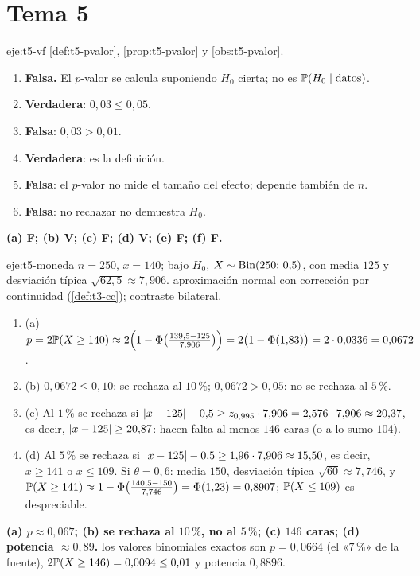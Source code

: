 \section{Tema 5}

\begin{solucion}{eje:t5-vf}
\planteamiento \cref{def:t5-pvalor}, \cref{prop:t5-pvalor} y \cref{obs:t5-pvalor}.
\pasos
\begin{enumerate}[label=(\alph*)]
  \item \textbf{Falsa.} El $p$-valor se calcula suponiendo $H_0$ cierta; no es $\mathbb{P}(H_0\mid\text{datos})$.
  \item \textbf{Verdadera}: $0{,}03\le0{,}05$.
  \item \textbf{Falsa}: $0{,}03>0{,}01$.
  \item \textbf{Verdadera}: es la definición.
  \item \textbf{Falsa}: el $p$-valor no mide el tamaño del efecto; depende también de $n$.
  \item \textbf{Falsa}: no rechazar no demuestra $H_0$.
\end{enumerate}
\resultado \textbf{(a) F; (b) V; (c) F; (d) V; (e) F; (f) F.}
\end{solucion}

\begin{solucion}{eje:t5-moneda}
\datos $n=250$, $x=140$; bajo $H_0$, $X\sim\operatorname{Bin}(250;\allowbreak\,0{,}5)$, con media $125$ y desviación típica $\sqrt{62{,}5}\approx7{,}906$.
\planteamiento aproximación normal con corrección por continuidad (\cref{def:t3-cc}); contraste bilateral.
\pasos
\begin{enumerate}[label=\arabic*.]
  \item (a) $p=2\mathbb{P}(X\ge140)\approx2\Bigl(1-\Phi\bigl(\tfrac{139{,}5-125}{7{,}906}\bigr)\Bigr)=2\bigl(1-\Phi(1{,}83)\bigr)=2\cdot0{,}0336=0{,}0672$.
  \item (b) $0{,}0672\le0{,}10$: se rechaza al $10\,\%$; $0{,}0672>0{,}05$: no se rechaza al $5\,\%$.
  \item (c) Al $1\,\%$ se rechaza si $\lvert x-125\rvert-0{,}5\ge z_{0{,}995}\cdot7{,}906=2{,}576\cdot7{,}906\approx20{,}37$, es decir, $\lvert x-125\rvert\ge20{,}87$: hacen falta al menos $146$ caras (o a lo sumo $104$).
  \item (d) Al $5\,\%$ se rechaza si $\lvert x-125\rvert-0{,}5\ge1{,}96\cdot7{,}906\approx15{,}50$, es decir, $x\ge141$ o $x\le109$. Si $\theta=0{,}6$: media $150$, desviación típica $\sqrt{60}\approx7{,}746$, y $\mathbb{P}(X\ge141)\approx1-\Phi\bigl(\tfrac{140{,}5-150}{7{,}746}\bigr)=\Phi(1{,}23)=0{,}8907$; $\mathbb{P}(X\le109)$ es despreciable.
\end{enumerate}
\resultado \textbf{(a) $p\approx0{,}067$; (b) se rechaza al $10\,\%$, no al $5\,\%$; (c) $146$ caras; (d) potencia $\approx0{,}89$.}
\comprobacion los valores binomiales exactos son $p=0{,}0664$ (el «$7\,\%$» de la fuente), $2\mathbb{P}(X\ge146)=0{,}0094\le0{,}01$ y potencia $0{,}8896$.
\end{solucion}

